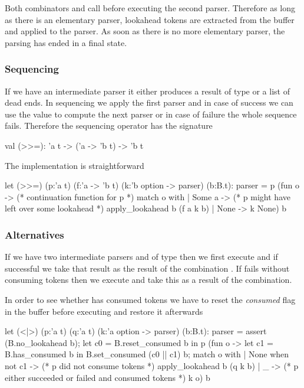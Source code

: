 Both combinators \code{>>=} and \code{<|>} call  before
executing the second parser. Therefore as long as there is an elementary
 parser, lookahead tokens are extracted from the buffer and
applied to the parser. As soon as there is no more elementary 
parser, the parsing has ended in a final state.



\subsubsection{Sequencing \code{>>=}}

If we have an intermediate parser  it either produces a result of
type  or a list of dead ends. In sequencing we apply the first parser
and in case of success we can use the value to compute the next parser or in
case of failure the whole sequence fails. Therefore the sequencing operator
\code{>>=} has the signature
%
\begin{ocaml}
  val (>>=): 'a t -> ('a -> 'b t) -> 'b t
\end{ocaml}
%
The implementation is straightforward
%
\begin{ocaml}
  let (>>=) (p:'a t) (f:'a -> 'b t) (k:'b option -> parser) (b:B.t): parser =
     p (fun o ->  (* continuation function for p *)
          match o with
          | Some a ->  (* p might have left over some lookahead *)
            apply_lookahead b (f a k b)
          | None ->
            k None)
       b
\end{ocaml}



\subsubsection{Alternatives \code{<|>}}

If we have two intermediate parsers  and  of type 
then we first execute  and if successful we take that result as the
result of the combination . If  fails without consuming
tokens then we execute  and take this as a result of the combination.

In order to see whether  has consumed tokens we have to reset the
\emph{consumed} flag in the buffer before executing  and restore it
afterwards
%
\begin{ocaml}
  let (<|>) (p:'a t) (q:'a t) (k:'a option -> parser) (b:B.t): parser =
     assert (B.no_lookahead b);
     let c0 = B.reset_consumed b in
     p (fun o ->
          let c1 = B.has_consumed b in
          B.set_consumed (c0 || c1) b;
          match o with
          | None when not c1 -> (* p did not consume tokens *)
            apply_lookahead b (q k b)
          | _ ->
            (* p either succeeded or failed and consumed tokens *)
            k o)
       b
\end{ocaml}





